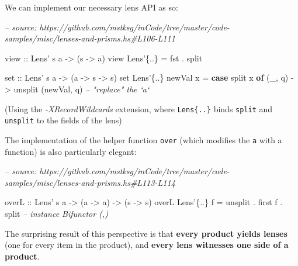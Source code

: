 \documentclass[]{article}
\newenvironment{Shaded}{}{}
\newcommand{\CommentTok}[1]{\textcolor[rgb]{0.38,0.63,0.69}{\textit{#1}}}
\newcommand{\DataTypeTok}[1]{\textcolor[rgb]{0.56,0.13,0.00}{#1}}
\newcommand{\FunctionTok}[1]{\textcolor[rgb]{0.02,0.16,0.49}{#1}}
\newcommand{\KeywordTok}[1]{\textcolor[rgb]{0.00,0.44,0.13}{\textbf{#1}}}
\newcommand{\NormalTok}[1]{#1}
\newcommand{\OtherTok}[1]{\textcolor[rgb]{0.00,0.44,0.13}{#1}}
\begin{document}
We can implement our necessary lens API as so:

\begin{Shaded}
\begin{Highlighting}[]
\CommentTok{-- source: https://github.com/mstksg/inCode/tree/master/code-samples/misc/lenses-and-prisms.hs#L106-L111}

\OtherTok{view ::} \DataTypeTok{Lens'}\NormalTok{ s a }\OtherTok{->}\NormalTok{ (s }\OtherTok{->}\NormalTok{ a)}
\NormalTok{view }\DataTypeTok{Lens'}\NormalTok{\{}\FunctionTok{..}\NormalTok{\} }\FunctionTok{=}\NormalTok{ fst }\FunctionTok{.}\NormalTok{ split}

\OtherTok{set ::} \DataTypeTok{Lens'}\NormalTok{ s a }\OtherTok{->}\NormalTok{ (a }\OtherTok{->}\NormalTok{ s }\OtherTok{->}\NormalTok{ s)}
\NormalTok{set }\DataTypeTok{Lens'}\NormalTok{\{}\FunctionTok{..}\NormalTok{\} newVal x }\FunctionTok{=} \KeywordTok{case}\NormalTok{ split x }\KeywordTok{of}
\NormalTok{    (_, q) }\OtherTok{->}\NormalTok{ unsplit (newVal, q)      }\CommentTok{-- "replace" the `a`}
\end{Highlighting}
\end{Shaded}

(Using the \emph{-XRecordWildcards} extension, where
\texttt{Lens\textquotesingle{}\{..\}} binds \texttt{split} and \texttt{unsplit}
to the fields of the lens)

The implementation of the helper function \texttt{over} (which modifies the
\texttt{a} with a function) is also particularly elegant:

\begin{Shaded}
\begin{Highlighting}[]
\CommentTok{-- source: https://github.com/mstksg/inCode/tree/master/code-samples/misc/lenses-and-prisms.hs#L113-L114}

\OtherTok{overL ::} \DataTypeTok{Lens'}\NormalTok{ s a }\OtherTok{->}\NormalTok{ (a }\OtherTok{->}\NormalTok{ a) }\OtherTok{->}\NormalTok{ (s }\OtherTok{->}\NormalTok{ s)}
\NormalTok{overL }\DataTypeTok{Lens'}\NormalTok{\{}\FunctionTok{..}\NormalTok{\}  f }\FunctionTok{=}\NormalTok{ unsplit }\FunctionTok{.}\NormalTok{ first f }\FunctionTok{.}\NormalTok{ split   }\CommentTok{-- instance Bifunctor (,)}
\end{Highlighting}
\end{Shaded}

The surprising result of this perspective is that \textbf{every product yields
lenses} (one for every item in the product), and \textbf{every lens witnesses
one side of a product}.
\end{document}
